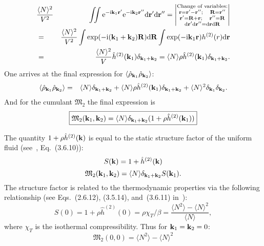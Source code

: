 \begin{eqnarray}
	&\frac{\langle N \rangle^2}{V^2} &\iint {\rm e}^{-{\rm i}\vb k_1\vb r'} {\rm e}^{-{\rm i}\vb k_2\vb r''} {\rm d} {\vb r'} {\rm d} {\vb r''} = 
	\left| \substack{\text{Change of variables:} \\ \vb r = \vb r' - \vb r''; \quad \vb R = \vb r'' \\
	\vb r' = \vb R + \vb r; \quad \vb r'' = \vb R \\ {\rm d} \vb r'{\rm d} \vb r'' = {\rm d} \vb r{\rm d} \vb R } 
	\right| 
	\nonumber\\
	&=& \frac{\langle N \rangle^2}{V^2} \int \exp(-{\rm i}(\vb k_1 + \vb k_2)\vb R) {\rm d} \vb R
	\int \exp(-{\rm i}\vb k_1 \vb r) h^{(2)}(r) {\rm d}\vb r
	\nonumber\\
	&=& \frac{\langle N \rangle^2}{V} \hat{h}^{(2)}(\vb k_1) \delta_{\vb{k}_1 + \vb{k}_2} = 
	\langle N \rangle \rho \hat{h}^{(2)}(\vb k_1) \delta_{\vb{k}_1 + \vb{k}_2}.
\end{eqnarray}
One arrives at the final expression for $\langle \hat{\rho}_{\vb k_1} \hat{\rho}_{\vb k_2} \rangle$:
\begin{eqnarray}
	\langle \hat{\rho}_{\vb k_1} \hat{\rho}_{\vb k_2} \rangle &=& \langle N \rangle\delta_{\vb k_1 + \vb k_2} + 
	\langle N \rangle \rho \hat{h}^{(2)}(\vb k_1) \delta_{\vb{k}_1 + \vb{k}_2}
	+ \langle N \rangle^2 \delta_{\vb k_1}\delta_{\vb k_2}
	\nonumber.
\end{eqnarray}
And for the cumulant $\mathfrak{M}_2$ the final expression is
\begin{equation}
	\boxed{
		\mathfrak{M}_2(\vb k_1, \vb k_2) = \langle N \rangle \delta_{\vb{k}_1 + \vb{k}_2} (1 + \rho\hat{h}^{(2)}(\vb 	k_1)) 
	}
\end{equation}

The quantity $1 + \rho \hat{h}^{(2)}(\vb k)$ is equal to the static structure factor of the uniform fluid (see~\cite{HANSEN2013ch2}, Eq.~(3.6.10)):
\begin{equation}
	S(\vb k) = 1 + \hat{h}^{(2)}(\vb k)
\end{equation}
\begin{equation}
	\mathfrak{M}_2(\vb k_1, \vb k_2)  = \langle N \rangle \delta_{\vb{k}_1 + \vb{k}_2} S(\vb k_1).
\end{equation}
The structure factor is related to the thermodynamic properties via the following relationship (see Eqs.~(2.6.12), (3.5.14), and~(3.6.11) in~\cite{hansen2013theory}):
\begin{equation}
	S(0) = 1 + \rho\hat{h}^{(2)}(0) = \rho \chi_T / \beta = \frac{\langle N^2 \rangle - \langle N \rangle^2}{\langle N \rangle},
\end{equation}
where $\chi_T$ is the isothermal compressibility.
Thus for $\vb k_1 = \vb k_2 = 0$:
\begin{equation}
	\boxed{
		\mathfrak{M}_2(0,0) = \langle N^2 \rangle - \langle N \rangle^2
	}
\end{equation}

